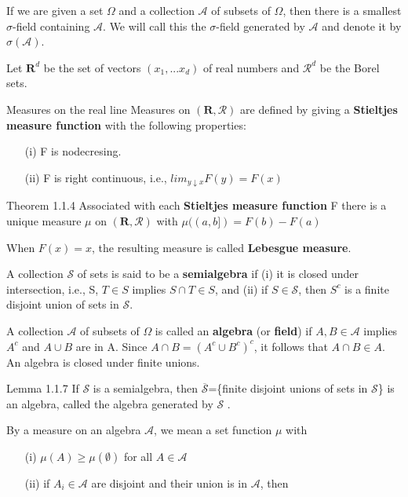 \documentclass{article}
\begin{document}
If we are given a set $\Omega$ and a collection $\mathcal{A}$ of subsets of $\Omega$, then there is a smallest $\sigma$-field containing $\mathcal{A}$. We will call this the $\sigma$-field
generated by $\mathcal{A}$ and denote it by $\sigma(\mathcal{A})$.

Let $\textbf{R}^d$ be the set of vectors $(x_1, . . . x_d)$ of real numbers and $\mathcal{R}^d$ be the Borel sets.

\begin{example}{Measures on the real line}
Measures on $(\textbf{R},\mathcal{R})$ are defined by giving a \textbf{Stieltjes measure function} with the following properties:	
\begin{enumerate}
  \item [(i)] F is nodecresing.
  \item [(ii)] F is right continuous, i.e., $lim_{y\downarrow x}F(y)=F(x)$
\end{enumerate}

\end{example}

\begin{theo}{Theorem 1.1.4}
	Associated with each \textbf{Stieltjes measure function} F there is a unique measure $\mu$ on $(\textbf{R},\mathcal{R})$ with $\mu((a,b]) = F(b)-F(a)$
	
	When $F(x)=x$, the resulting measure is called \textbf{Lebesgue measure}.
\end{theo}

A collection $\mathcal{S}$ of sets is said to be a \textbf{semialgebra} if (i) it is closed under intersection,
i.e., S, $T \in S$ implies $S\cap T\in S$, and (ii) if $S \in \mathcal{S}$, then $S^c$ is a finite disjoint union of sets
in $\mathcal{S}$.

A collection $\mathcal{A}$ of subsets of $\Omega$ is called an \textbf{algebra} (or \textbf{field}) if $A,B\in \mathcal{A}$ implies $A^c$ and $A\cup B$ are in A. Since $A\cap B=(A^c\cup B^c)^c$, it follows that $A\cap B\in A$. An algebra is closed under finite unions.

\begin{theo}{Lemma 1.1.7}
	If $\mathcal{S}$ is a semialgebra, then $\overline{\mathcal{S}}$=\{finite disjoint unions of sets in $\mathcal{S}$\} is an
algebra, called the algebra generated by $\mathcal{S}$ .
\end{theo}

By a measure on an algebra $\mathcal{A}$, we mean a set function $\mu $ with

\begin{enumerate}

  \item [(i)] $\mu(A)\ge\mu(\emptyset)$ for all $A\in \mathcal{A}$

  \item [(ii)] if $A_i\in \mathcal{A}$ are disjoint and their union is in $\mathcal{A}$, then
\end{enumerate}
\end{document}
